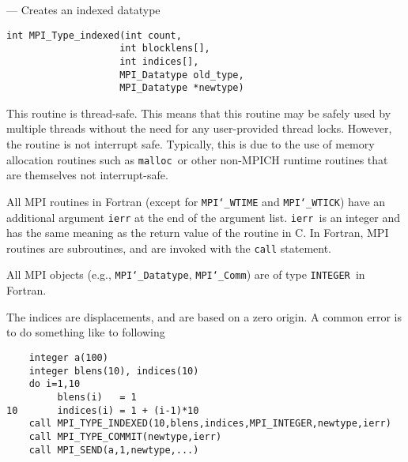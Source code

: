\startmanpage
{}
--- Creates an indexed datatype 
\startvb\begin{verbatim}
int MPI_Type_indexed(int count,
                    int blocklens[],
                    int indices[],
                    MPI_Datatype old_type,
                    MPI_Datatype *newtype)

\end{verbatim}
\endvb

\par
{}
\par
{}
\par
This routine is thread-safe.  This means that this routine may be
safely used by multiple threads without the need for any user-provided
thread locks.  However, the routine is not interrupt safe.  Typically,
this is due to the use of memory allocation routines such as {\tt malloc
}or other non-MPICH runtime routines that are themselves not interrupt-safe.
\par
{}
All MPI routines in Fortran (except for {\tt MPI{\tt \char`\_}WTIME} and {\tt MPI{\tt \char`\_}WTICK}) have
an additional argument {\tt ierr} at the end of the argument list.  {\tt ierr
}is an integer and has the same meaning as the return value of the routine
in C.  In Fortran, MPI routines are subroutines, and are invoked with the
{\tt call} statement.
\par
All MPI objects (e.g., {\tt MPI{\tt \char`\_}Datatype}, {\tt MPI{\tt \char`\_}Comm}) are of type {\tt INTEGER
}in Fortran.
\par
The indices are displacements, and are based on a zero origin.  A common error
is to do something like to following
\begin{verbatim}
    integer a(100)
    integer blens(10), indices(10)
    do i=1,10
         blens(i)   = 1
10       indices(i) = 1 + (i-1)*10
    call MPI_TYPE_INDEXED(10,blens,indices,MPI_INTEGER,newtype,ierr)
    call MPI_TYPE_COMMIT(newtype,ierr)
    call MPI_SEND(a,1,newtype,...)
\end{verbatim}

